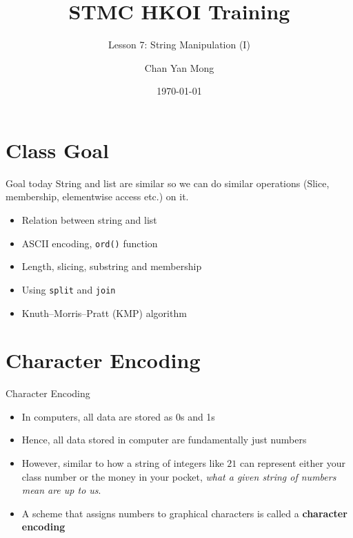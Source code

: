 \documentclass[10pt,xcolor={table,dvipsnames},t]{beamer}
\title[Your Short Title]{STMC HKOI Training}
\subtitle{Lesson 7: String Manipulation (I)}
\author{Chan Yan Mong}
\date{\today}
\begin{document}
\begin{frame}
  \titlepage
\end{frame}


\section{Class Goal}

\begin{frame}{Goal today}
String and list are similar so we can do similar operations (Slice, membership, elementwise access etc.) on it. 
\begin{itemize}
  \item Relation between string and list 
  \item ASCII encoding, \texttt{ord()} function
  \item Length, slicing, substring and membership 
  \item Using \texttt{split} and \texttt{join}
  \item Knuth–Morris–Pratt (KMP) algorithm 
\end{itemize}

\end{frame}

\section{Character Encoding}

\begin{frame}[fragile]{Character Encoding}
  \begin{itemize}
    \item In computers, all data are stored as 0s and 1s
    \item Hence, all data stored in computer are fundamentally just numbers 
    \item However, similar to how a string of integers like $21$ can represent either your class number or the money in your pocket, \textit{what a given string of numbers mean are up to us}.
    \item A scheme that assigns numbers to graphical characters is called a \textbf{character encoding}
  \end{itemize}
\end{frame}
\end{document}

